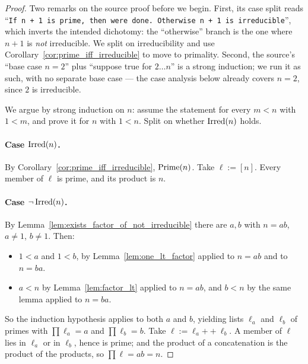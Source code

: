 \begin{proof}
  \leanok
  Two remarks on the source proof before we begin. First, its case split reads
  ``\texttt{If n + 1 is prime, then were done. Otherwise n + 1 is irreducible}'',
  which inverts the intended dichotomy: the ``otherwise'' branch is the one where
  $n+1$ is \emph{not} irreducible. We split on irreducibility and use
  Corollary~\ref{cor:prime_iff_irreducible} to move to primality. Second, the
  source's ``base case $n = 2$'' plus ``suppose true for $2 \dots n$'' is a
  strong induction; we run it as such, with no separate base case --- the case
  analysis below already covers $n = 2$, since $2$ is irreducible.

  We argue by strong induction on $n$: assume the statement for every $m < n$
  with $1 < m$, and prove it for $n$ with $1 < n$. Split on whether $\mathrm{Irred}(n)$
  holds.

  \paragraph{Case $\mathrm{Irred}(n)$.} By Corollary~\ref{cor:prime_iff_irreducible},
  $\mathrm{Prime}(n)$. Take $\ell := [n]$. Every member of $\ell$ is prime, and its product
  is $n$.

  \paragraph{Case $\lnot\,\mathrm{Irred}(n)$.} By
  Lemma~\ref{lem:exists_factor_of_not_irreducible} there are $a, b$ with
  $n = a b$, $a \neq 1$, $b \neq 1$. Then:
  \begin{itemize}
    \item $1 < a$ and $1 < b$, by Lemma~\ref{lem:one_lt_factor} applied to
      $n = a b$ and to $n = b a$.
    \item $a < n$ by Lemma~\ref{lem:factor_lt} applied to $n = a b$, and $b < n$
      by the same lemma applied to $n = b a$.
  \end{itemize}
  So the induction hypothesis applies to both $a$ and $b$, yielding lists
  $\ell_a$ and $\ell_b$ of primes with $\prod \ell_a = a$ and
  $\prod \ell_b = b$. Take $\ell := \ell_a \mathbin{+\!\!+} \ell_b$. A member of
  $\ell$ lies in $\ell_a$ or in $\ell_b$, hence is prime; and the product of a
  concatenation is the product of the products, so
  $\prod \ell = a b = n$.
\end{proof}

